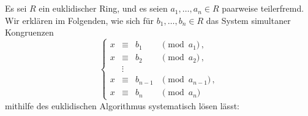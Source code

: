 \section{}

Es sei $R$ ein euklidischer Ring, und es seien $a_1, \dotsc, a_n \in R$ paarweise teilerfremd.
Wir erklären im Folgenden, wie sich für $b_1, \dotsc, b_n \in R$ das System simultaner Kongruenzen
\[
  \left\{
    \begin{array}{rcll}
      x &\equiv& b_1      & \pmod{a_1}      \,, \\
      x &\equiv& b_2      & \pmod{a_2}      \,, \\
        &\vdots&          &                     \\
      x &\equiv& b_{n-1}  & \pmod{a_{n-1}}  \,, \\
      x &\equiv& b_n      & \pmod{a_n}
    \end{array}
  \right.
\]
mithilfe des euklidischen Algorithmus systematisch lösen lässt:
